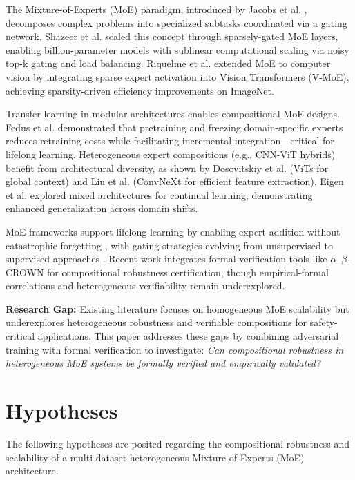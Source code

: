 \documentclass[11pt,a4paper]{article}
\begin{document}
The Mixture-of-Experts (MoE) paradigm, introduced by Jacobs et al. \cite{jacobs1991}, decomposes complex problems into specialized subtasks coordinated via a gating network. Shazeer et al. \cite{shazeer2017} scaled this concept through sparsely-gated MoE layers, enabling billion-parameter models with sublinear computational scaling via noisy top-k gating and load balancing. Riquelme et al. \cite{riquelme2021} extended MoE to computer vision by integrating sparse expert activation into Vision Transformers (V-MoE), achieving sparsity-driven efficiency improvements on ImageNet.

Transfer learning in modular architectures enables compositional MoE designs. Fedus et al. \cite{fedus2023} demonstrated that pretraining and freezing domain-specific experts reduces retraining costs while facilitating incremental integration—critical for lifelong learning. Heterogeneous expert compositions (e.g., CNN-ViT hybrids) benefit from architectural diversity, as shown by Dosovitskiy et al. \cite{dosovitskiy2021} (ViTs for global context) and Liu et al. \cite{liu2022} (ConvNeXt for efficient feature extraction). Eigen et al. \cite{eigen2017} explored mixed architectures for continual learning, demonstrating enhanced generalization across domain shifts.

MoE frameworks support lifelong learning by enabling expert addition without catastrophic forgetting \cite{ramasesh2023}, with gating strategies evolving from unsupervised \cite{jordan1991} to supervised approaches \cite{riquelme2021}. Recent work integrates formal verification tools like $\alpha$--$\beta$-CROWN \cite{wang2021} for compositional robustness certification, though empirical-formal correlations and heterogeneous verifiability remain underexplored.

\textbf{Research Gap:} Existing literature focuses on homogeneous MoE scalability but underexplores heterogeneous robustness and verifiable compositions for safety-critical applications. This paper addresses these gaps by combining adversarial training with formal verification to investigate: \textit{Can compositional robustness in heterogeneous MoE systems be formally verified and empirically validated?}

\section{Hypotheses}

The following hypotheses are posited regarding the compositional robustness and scalability of a multi-dataset heterogeneous Mixture-of-Experts (MoE) architecture.
\end{document}
